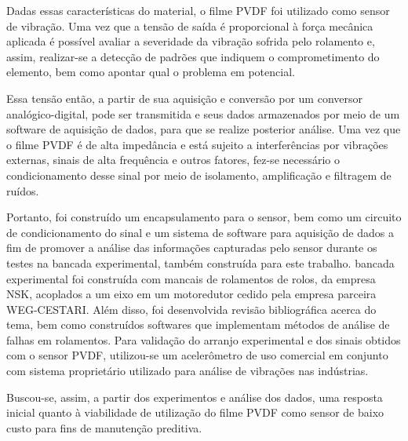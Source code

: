 \documentclass[
	12pt,				
	oneside,			
	a4paper,			
	english,			
	brazil,	
	sumario=abnt-6027-2012		
	]{abntex2ppgsi}
\begin{document}
Dadas essas características do material, o filme PVDF foi utilizado como sensor de vibração. Uma vez que a tensão de saída é proporcional à força mecânica aplicada é possível avaliar a severidade da vibração sofrida pelo rolamento e, assim, realizar-se a detecção de padrões que indiquem o comprometimento do elemento, bem como apontar qual o problema em potencial.


Essa tensão então, a partir de sua aquisição e conversão por um conversor analógico-digital, pode ser transmitida e seus dados armazenados por meio de um software de aquisição de dados, para que se realize posterior análise. Uma vez que o filme PVDF é de alta impedância e está sujeito a interferências por vibrações externas, sinais de alta frequência e outros fatores, fez-se necessário o condicionamento desse sinal por meio de isolamento, amplificação e filtragem de ruídos. 

Portanto, foi construído um encapsulamento para o sensor, bem como um circuito de condicionamento do sinal e um sistema de software para aquisição de dados a fim de promover a análise das informações capturadas pelo sensor durante os testes na bancada experimental, também construída para este trabalho. bancada experimental foi construída com mancais de rolamentos de rolos, da empresa NSK, acoplados a um eixo em um motoredutor cedido pela empresa parceira WEG-CESTARI. Além disso, foi desenvolvida revisão bibliográfica acerca do tema, bem como construídos softwares que implementam métodos de análise de falhas em rolamentos. Para validação do arranjo experimental e dos sinais obtidos com o sensor PVDF, utilizou-se um acelerômetro de uso comercial em conjunto com sistema proprietário utilizado para análise de vibrações nas indústrias.

Buscou-se, assim, a partir dos experimentos e análise dos dados, uma resposta inicial quanto à viabilidade de utilização do filme PVDF como sensor de baixo custo para fins de manutenção preditiva.

\end{document}
